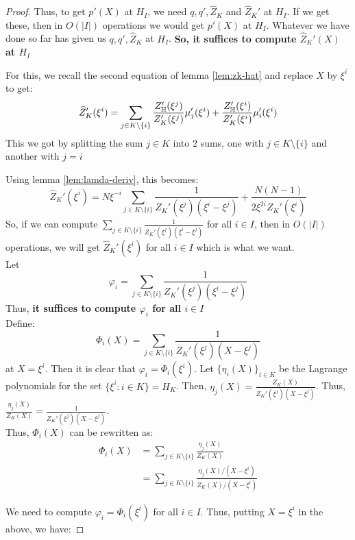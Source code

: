 \begin{proof}
    Thus, to get $p'(X)$ at $H_I$, we need $q, q', \hat{Z}_K$ and $\hat{Z}_K'$ at $H_I$. If we get these, then in $O(|I|)$ operations we would get $p'(X)$ at $H_I$.
    Whatever we have done so far has given us $q, q', \hat{Z}_K$ at $H_I$.
    \textbf{So, it suffices to compute $\hat{Z}_K'(X)$ at $H_I$\\}

    For this, we recall the second equation of lemma \ref{lem:zk-hat} and replace $X$ by $\xi^i$ to get:
    $$  \widehat{Z}_K'(\xi^i) = \sum_{j\in K\setminus \{i\}} \frac{Z_{\mathbb{H}}'(\xi^j)}{Z_K'(\xi^j)}\mu_j'(\xi^i) + \frac{Z_{\mathbb{H}}'(\xi^i)}{Z_K'(\xi^i)}\mu_i'(\xi^i)$$
    This we got by splitting the sum $j \in K$ into 2 sums, one with $j \in K \setminus \{i\}$ and another with $j=i$

    Using lemma \ref{lem:lamda-deriv}, this becomes:
    $$ \widehat{Z}_K'(\xi^i)= N\xi^{-i}\sum_{j\in K\setminus \{i\}}\frac{1}{Z_K'(\xi^j)(\xi^i-\xi^j)} + \frac{N(N-1)}{2\xi^{2i}Z_K'(\xi^i)}$$
    So, if we can compute $\sum_{j\in K\setminus \{i\}}\frac{1}{Z_K'(\xi^j)(\xi^i-\xi^j)}$ for all $i \in I$, then in $O(|I|)$ operations, we will get $\hat{Z}_K'(\xi^i)$ for all $i \in I$ which is what we want.\\

    Let $$\varphi_i=\sum_{j\in K\setminus \{i\}}\frac{1}{Z_K'(\xi^j)(\xi^i-\xi^j)}$$
    Thus,\textbf{ it suffices to compute $\varphi_i$ for all $i \in I$}\\

    Define:
    $$ \Phi_i(X) = \sum_{j\in K\setminus \{i\}} \frac{1}{Z_K'(\xi^j)(X-\xi^j)} $$
    at $X=\xi^i$. Then it is clear that $\varphi_i=\Phi_i(\xi^i)$.
    Let $\{\eta_i(X)\}_{i\in K}$ be the Lagrange polynomials for the set $\{\xi^i:i\in K\}= H_K$.
    Then, $\eta_j(X)=\frac{Z_K(X)}{Z_K'(\xi^j)(X-\xi^j)}$.
    Thus, $\frac{\eta_j(X)}{Z_K(X)}=\frac{1}{Z_K'(\xi^j)(X-\xi^j)}$.\\
    Thus, $\Phi_i(X)$ can be rewritten as:
    \begin{align*}
        \Phi_i(X)&=\sum_{j\in K\setminus \{i\}} \frac{\eta_j(X)}{Z_K(X)}\\
        &= \sum_{j\in K\setminus \{i\}} \frac{\eta_j(X)/(X-\xi^i)}{Z_K(X)/(X-\xi^i)}
    \end{align*}

    We need to compute $\varphi_i=\Phi_i(\xi^i)$ for all $i \in I$. Thus, putting $X=\xi^i$ in the above, we have:


\end{proof}
